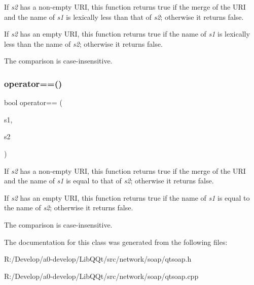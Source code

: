 If {\itshape s2} has a non-\/empty U\+RI, this function returns true if the merge of the U\+RI and the name of {\itshape s1} is lexically less than that of {\itshape s2}; otherwise it returns false.

If {\itshape s2} has an empty U\+RI, this function returns true if the name of {\itshape s1} is lexically less than the name of {\itshape s2}; otherwise it returns false.

The comparison is case-\/insensitive. \mbox{\label{class_qt_soap_q_name_a92f65e83e578dc8162316a1c1d8fbcf6}} 
\subsubsection{\texorpdfstring{operator==()}{operator==()}}
{\footnotesize\ttfamily bool operator== (\begin{DoxyParamCaption}\item[{const \mbox{\hyperlink{class_qt_soap_q_name}{Qt\+Soap\+Q\+Name}} \&}]{s1,  }\item[{const \mbox{\hyperlink{class_qt_soap_q_name}{Qt\+Soap\+Q\+Name}} \&}]{s2 }\end{DoxyParamCaption})\hspace{0.3cm}{\ttfamily [related]}}

If {\itshape s2} has a non-\/empty U\+RI, this function returns true if the merge of the U\+RI and the name of {\itshape s1} is equal to that of {\itshape s2}; otherwise it returns false.

If {\itshape s2} has an empty U\+RI, this function returns true if the name of {\itshape s1} is equal to the name of {\itshape s2}; otherwise it returns false.

The comparison is case-\/insensitive. 

The documentation for this class was generated from the following files\+:\begin{DoxyCompactItemize}
\item 
R\+:/\+Develop/a0-\/develop/\+Lib\+Q\+Qt/src/network/soap/qtsoap.\+h\item 
R\+:/\+Develop/a0-\/develop/\+Lib\+Q\+Qt/src/network/soap/qtsoap.\+cpp\end{DoxyCompactItemize}

